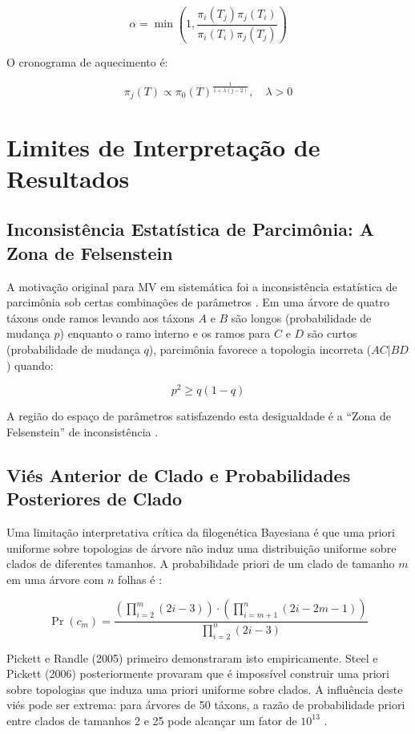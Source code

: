 $$\alpha = \min\left(1, \frac{\pi_i(T_j) \pi_j(T_i)}{\pi_i(T_i) \pi_j(T_j)} \right)$$

O cronograma de aquecimento é:

$$\pi_j(T) \propto \pi_0(T)^{\frac{1}{1+\lambda(j-2)}}, \quad \lambda > 0$$

\section{Limites de Interpretação de Resultados}

\subsection{Inconsistência Estatística de Parcimônia: A Zona de Felsenstein}

A motivação original para MV em sistemática foi a inconsistência estatística de parcimônia sob certas combinações de parâmetros \parencite{felsenstein1978}. Em uma árvore de quatro táxons onde ramos levando aos táxons $A$ e $B$ são longos (probabilidade de mudança $p$) enquanto o ramo interno e os ramos para $C$ e $D$ são curtos (probabilidade de mudança $q$), parcimônia favorece a topologia incorreta ($AC|BD$) quando:

$$p^2 \geq q(1-q)$$

A região do espaço de parâmetros satisfazendo esta desigualdade é a ``Zona de Felsenstein'' de inconsistência \parencite{wheeler2012}.

\subsection{Viés Anterior de Clado e Probabilidades Posteriores de Clado}

Uma limitação interpretativa crítica da filogenética Bayesiana é que uma priori uniforme sobre topologias de árvore não induz uma distribuição uniforme sobre clados de diferentes tamanhos. A probabilidade priori de um clado de tamanho $m$ em uma árvore com $n$ folhas é \parencite{wheeler2012}:

$$\Pr(c_m) = \frac{\left(\prod_{i=2}^{m} (2i-3)\right) \cdot \left(\prod_{i=m+1}^{n} (2i-2m-1)\right)}{\prod_{i=2}^{n} (2i-3)}$$

Pickett e Randle (2005) primeiro demonstraram isto empiricamente. Steel e Pickett (2006) posteriormente provaram que é impossível construir uma priori sobre topologias que induza uma priori uniforme sobre clados. A influência deste viés pode ser extrema: para árvores de 50 táxons, a razão de probabilidade priori entre clados de tamanhos 2 e 25 pode alcançar um fator de $10^{13}$ \parencite{wheeler2012}.

